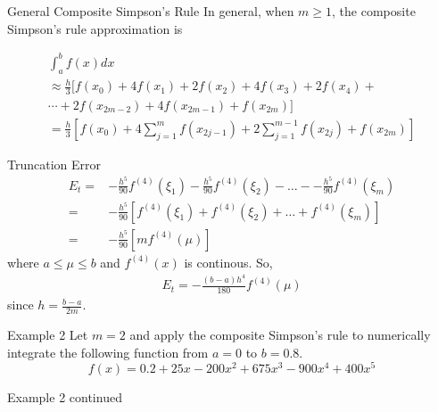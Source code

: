 \documentclass[12pt]{beamer}
\begin{document}
\begin{frame}{General Composite Simpson's Rule}
In general, when $m \geq 1$, the composite Simpson's rule approximation is

\begin{multline*} 
 \int_{a}^{b} f(x)dx \\
 \approx \frac{h}{3}  [f(x_0) + 4f(x_1) + 2f(x_2) + 4f(x_3) + 2f(x_4) + \\ 
     \dotsm + 2f(x_{2m-2}) + 4f(x_{2m-1}) + f(x_{2m})]  \\
 = \frac{h}{3} \left [ f(x_0) + 4\sum_{j=1}^{m}f(x_{2j-1}) + 2\sum_{j=1}^{m-1}f(x_{2j}) + f(x_{2m}) \right ]
\end{multline*} 


\end{frame}

\begin{frame}{Truncation Error}
\begin{align*} 
E_t =& -\frac{h^5}{90} f^{(4)}(\xi_1) -\frac{h^5}{90} f^{(4)}(\xi_2) - \dots - -\frac{h^5}{90} f^{(4)}(\xi_m)  \\
=& -\frac{h^5}{90} \left [ f^{(4)}(\xi_1) + f^{(4)}(\xi_2) + \dots + f^{(4)}(\xi_m) \right ] \\
=& - \frac{h^5}{90} [ m f^{(4)}(\mu)]
\end{align*} 
where $a \leq \mu\leq b$ and $f^{(4)}(x)$ is continous. So,
\begin{align*} 
E_t = -\frac{(b-a)h^4}{180}f^{(4)}(\mu)
\end{align*} 
since $h = \frac{b-a}{2m}$. 
\end{frame} 

\begin{frame}{Example 2}
Let $m=2$ and apply the composite Simpson's rule to numerically integrate the following function from $a=0$ to $b=0.8$.
\[
f(x)=0.2+25x-200x^2+675x^3-900x^4+400x^5
\]
\vspace{3 in}
\end{frame}

\begin{frame}{Example 2 continued}

\end{frame}
\end{document}
